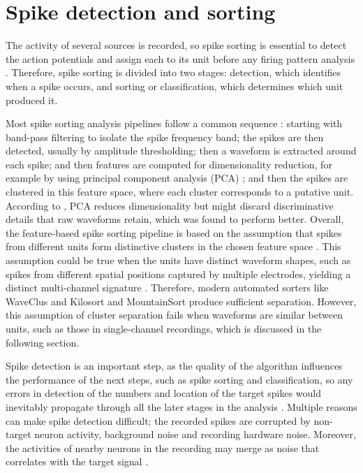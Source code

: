 \documentclass[ %
                    author={Rzan Alkabier},
                    supervisor={Dr. Zahraa Abdallah},
                    degree={MSc},
                     title={Denoising Extracellular Recording for Spike Detection and Classification on Single Channels},
                    subtitle={Does denoising improve detection and classification performance?},
                      type={},
                      year={2026}]{dissertation}
\begin{document}
\section{Spike detection and sorting}
\label{sec:detection}
The activity of several sources is recorded, so spike sorting is essential to detect the action potentials and assign each to its unit before any firing pattern analysis \cite{rey_past_2015}. Therefore, spike sorting is divided into two stages: detection, which identifies when a spike occurs, and sorting or classification, which determines which unit produced it.  
\bigskip

\noindent
Most spike sorting analysis pipelines follow a common sequence \cite{rey_past_2015}: starting with band-pass filtering to isolate the spike frequency band; the spikes are then detected, usually by amplitude thresholding; then a waveform is extracted around each spike; and then features are computed for dimensionality reduction, for example by using principal component analysis (PCA) \cite{quiroga_unsupervised_2004}; and then the spikes are clustered in this feature space, where each cluster corresponds to a putative unit. According to \cite{troglio_hybrid_2026}, PCA reduces dimensionality but might discard discriminative details that raw waveforms retain, which was found to perform better. 
Overall, the feature-based spike sorting pipeline is based on the assumption that spikes from different units form distinctive clusters in the chosen feature space \cite{lewicki_review_1998}. This assumption could be true when the units have distinct waveform shapes, such as spikes from different spatial positions captured by multiple electrodes, yielding a distinct multi-channel signature \cite{harris_accuracy_2000}. Therefore, modern automated sorters like WaveClus \cite{quiroga_unsupervised_2004} and Kilosort and MountainSort produce sufficient separation. However, this assumption of cluster separation fails when waveforms are similar between units, such as those in single-channel recordings, which is discussed in the following section. 
\bigskip

\noindent
Spike detection is an important step, as the quality of the algorithm influences the performance of the next steps, such as spike sorting and classification, so any errors in detection of the numbers and location of the target spikes would inevitably propagate through all the later stages in the analysis \cite{azami_extracellular_2015}. Multiple reasons can make spike detection difficult; the recorded spikes are corrupted by non-target neuron activity, background noise and recording hardware noise. Moreover, the activities of nearby neurons in the recording may merge as noise that correlates with the target signal \cite{azami_extracellular_2015}.  
\end{document}
